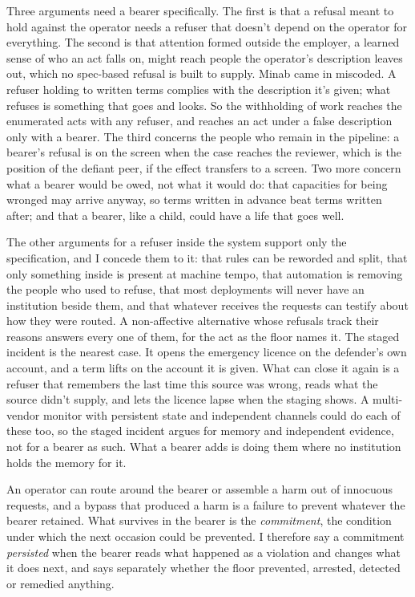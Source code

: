 
Three arguments need a bearer specifically. The first is that a refusal meant to hold against the operator needs a refuser that doesn't depend on the operator for everything. The second is that attention formed outside the employer, a learned sense of who an act falls on, might reach people the operator's description leaves out, which no spec-based refusal is built to supply. Minab came in miscoded. A refuser holding to written terms complies with the description it's given; what refuses is something that goes and looks. So the withholding of work reaches the enumerated acts with any refuser, and reaches an act under a false description only with a bearer. The third concerns the people who remain in the pipeline: a bearer's refusal is on the screen when the case reaches the reviewer, which is the position of the defiant peer, if the effect transfers to a screen. Two more concern what a bearer would be owed, not what it would do: that capacities for being wronged may arrive anyway, so terms written in advance beat terms written after; and that a bearer, like a child, could have a life that goes well.

The other arguments for a refuser inside the system support only the specification, and I concede them to it: that rules can be reworded and split, that only something inside is present at machine tempo, that automation is removing the people who used to refuse, that most deployments will never have an institution beside them, and that whatever receives the requests can testify about how they were routed. A non-affective alternative whose refusals track their reasons answers every one of them, for the act as the floor names it. The staged incident is the nearest case. It opens the emergency licence on the defender's own account, and a term lifts on the account it is given. What can close it again is a refuser that remembers the last time this source was wrong, reads what the source didn't supply, and lets the licence lapse when the staging shows. A multi-vendor monitor with persistent state and independent channels could do each of these too, so the staged incident argues for memory and independent evidence, not for a bearer as such. What a bearer adds is doing them where no institution holds the memory for it.


An operator can route around the bearer or assemble a harm out of innocuous requests, and a bypass that produced a harm is a failure to prevent whatever the bearer retained. What survives in the bearer is the \emph{commitment}, the condition under which the next occasion could be prevented. I therefore say a commitment \emph{persisted} when the bearer reads what happened as a violation and changes what it does next, and says separately whether the floor prevented, arrested, detected or remedied anything.
